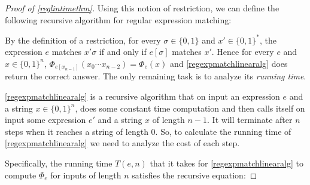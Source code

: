 \begin{proof}[Proof of \cref{reglintimethm}]
Using this notion of restriction, we can define the following recursive
algorithm for regular expression matching:

\hypertarget{regexpmatchlinearalg}{}

By the definition of a restriction, for every \(\sigma\in \{0,1\}\) and
\(x'\in \{0,1\}^*\), the expression \(e\) matches \(x'\sigma\) if and
only if \(e[\sigma]\) matches \(x'\). Hence for every \(e\) and
\(x\in \{0,1\}^n\), \(\Phi_{e[x_{n-1}]}(x_0\cdots x_{n-2}) = \Phi_e(x)\)
and \cref{regexpmatchlinearalg} does return the correct answer. The only
remaining task is to analyze its \emph{running time}.

\cref{regexpmatchlinearalg} is a recursive algorithm that on input an
expression \(e\) and a string \(x\in \{0,1\}^n\), does some constant
time computation and then calls itself on input some expression \(e'\)
and a string \(x\) of length \(n-1\). It will terminate after \(n\)
steps when it reaches a string of length \(0\). So, to calculate the
running time of \cref{regexpmatchlinearalg} we need to analyze the cost
of each step.

Specifically, the running time \(T(e,n)\) that it takes for
\cref{regexpmatchlinearalg} to compute \(\Phi_e\) for inputs of length
\(n\) satisfies the recursive equation:


\end{proof}
